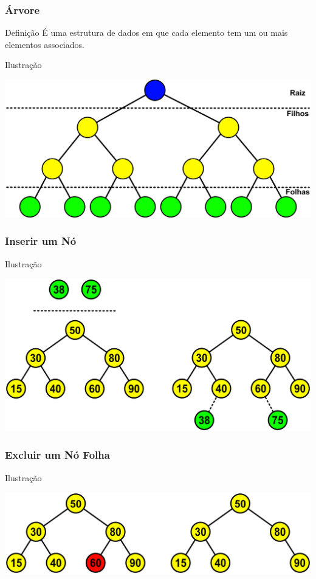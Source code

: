 \documentclass{beamer}
\begin{document}
\begin{frame}
\frametitle{Árvore}

\begin{block}{Definição}
	É uma estrutura de dados em que cada elemento tem um ou mais elementos associados.
\end{block}\vfill

\begin{exampleblock}{Ilustração}
	\begin{center}
		\includegraphics[scale=0.5]{img/arvore.png}
	\end{center}
\end{exampleblock}
\end{frame}

\begin{frame}
\frametitle{Inserir um Nó}

\begin{exampleblock}{Ilustração}
	\begin{center}
		\includegraphics[scale=0.5]{img/arvore-inserir.png}
	\end{center}
\end{exampleblock}
\end{frame}

\begin{frame}
\frametitle{Excluir um Nó Folha}

\begin{exampleblock}{Ilustração}
	\begin{center}
		\includegraphics[scale=0.5]{img/arvore-excluir-folha.png}
	\end{center}
\end{exampleblock}
\end{frame}
\end{document}
